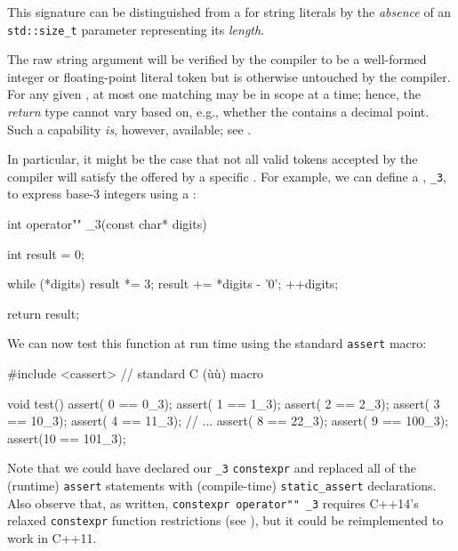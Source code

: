 \noindent This signature can be distinguished from a  for string literals by the \emph{absence} of an
\lstinline!std::size_t! parameter representing its \emph{length}.

The raw string argument will be verified by the compiler to be a
well-formed integer or floating-point literal token but is otherwise
untouched by the compiler. For any given , at most
one matching  may be in scope at a time; hence,
the \emph{return} type cannot vary based on, e.g., whether the
 contains a decimal point. Such a capability
\emph{is}, however, available; see .

In particular, it might be the case that not all valid tokens accepted
by the compiler will satisfy the  offered by a
specific . For example, we can define a , \lstinline!_3!, to express base-3 integers using a :

\begin{emcppslisting}[emcppsbatch=e11]
int operator"" _3(const char* digits)
{
    int result = 0;

    while (*digits)
    {
        result *= 3;
        result += *digits - '0';
        ++digits;
    }

    return result;
}
\end{emcppslisting}

\noindent We can now test this function at run time using the standard
\lstinline!assert! macro:

\begin{emcppslisting}[emcppsbatch=e11]
#include <cassert>  // standard C (ù{}ù) macro

void test()
{
    assert( 0 ==   0_3);
    assert( 1 ==   1_3);
    assert( 2 ==   2_3);
    assert( 3 ==  10_3);
    assert( 4 ==  11_3);
    // ...
    assert( 8 ==  22_3);
    assert( 9 == 100_3);
    assert(10 == 101_3);
}
\end{emcppslisting}

\noindent Note that we could have declared our \lstinline!_3!  \lstinline!constexpr! and replaced all of the (runtime)
\lstinline!assert! statements with (compile-time) \lstinline!static_assert! declarations. Also observe that, as written, \lstinline!constexpr!~\lstinline!operator""!~\lstinline!_3! requires C++14's relaxed \lstinline!constexpr! function restrictions (see ), but it could be reimplemented to work in C++11.

